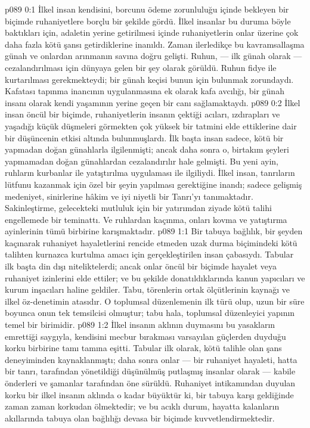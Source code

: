 \vs p089 0:1 İlkel insan kendisini, borcunu ödeme zorunluluğu içinde bekleyen bir biçimde ruhaniyetlere borçlu bir şekilde gördü. İlkel insanlar bu duruma böyle baktıkları için, adaletin yerine getirilmesi içinde ruhaniyetlerin onlar üzerine çok daha fazla kötü şansı getirdiklerine inanıldı. Zaman ilerledikçe bu kavramsallaşma günah ve onlardan arınmanın savına doğru gelişti. Ruhun, --- ilk günah olarak --- cezalandırılması için dünyaya gelen bir şey olarak görüldü. Ruhun fidye ile kurtarılması gerekmekteydi; bir günah keçisi bunun için bulunmak zorundaydı. Kafatası tapınma inancının uygulanmasına ek olarak kafa avcılığı, bir günah insanı olarak kendi yaşamının yerine geçen bir canı sağlamaktaydı.
\vs p089 0:2 İlkel insan öncül bir biçimde, ruhaniyetlerin insanın çektiği acıları, ızdırapları ve yaşadığı küçük düşmeleri görmekten çok yüksek bir tatmini elde ettiklerine dair bir düşüncenin etkisi altında bulunmuşlardı. İlk başta insan sadece, kötü bir yapmadan doğan günahlarla ilgilenmişti; ancak daha sonra o, birtakım şeyleri yapmamadan doğan günahlardan cezalandırılır hale gelmişti. Bu yeni ayin, ruhların kurbanlar ile yatıştırılma uygulaması ile ilgiliydi. İlkel insan, tanrıların lütfunu kazanmak için özel bir şeyin yapılması gerektiğine inandı; sadece gelişmiş medeniyet, sinirlerine hâkim ve iyi niyetli bir Tanrı’yı tanımaktadır. Sakinleştirme, gelecekteki mutluluk için bir yatırımdan ziyade kötü talihi engellemede bir teminattı. Ve ruhlardan kaçınma, onları kovma ve yatıştırma ayinlerinin tümü birbirine karışmaktadır.
\vs p089 1:1 Bir tabuya bağlılık, bir şeyden kaçınarak ruhaniyet hayaletlerini rencide etmeden uzak durma biçimindeki kötü talihten kurnazca kurtulma amacı için gerçekleştirilen insan çabasıydı. Tabular ilk başta din dışı niteliktelerdi; ancak onlar öncül bir biçimde hayalet veya ruhaniyet izinlerini elde ettiler; ve bu şekilde donatıldıklarında kanun yapıcıları ve kurum inşacıları haline geldiler. Tabu, törenlerin ortak ölçütlerinin kaynağı ve ilkel öz\hyp{}denetimin atasıdır. O toplumsal düzenlemenin ilk türü olup, uzun bir süre boyunca onun tek temsilcisi olmuştur; tabu hala, toplumsal düzenleyici yapının temel bir birimidir.
\vs p089 1:2 İlkel insanın aklının duymasını bu yasakların emrettiği saygıyla, kendisini mecbur bırakması varsayılan güçlerden duyduğu korku birbirine tamı tamına eşitti. Tabular ilk olarak, kötü talihle olan şans deneyiminden kaynaklanmıştı; daha sonra onlar --- bir ruhaniyet hayaleti, hatta bir tanrı, tarafından yönetildiği düşünülmüş putlaşmış insanlar olarak --- kabile önderleri ve şamanlar tarafından öne sürüldü. Ruhaniyet intikamından duyulan korku bir ilkel insanın aklında o kadar büyüktür ki, bir tabuya karşı geldiğinde zaman zaman korkudan ölmektedir; ve bu acıklı durum, hayatta kalanların akıllarında tabuya olan bağlılığı devasa bir biçimde kuvvetlendirmektedir.
